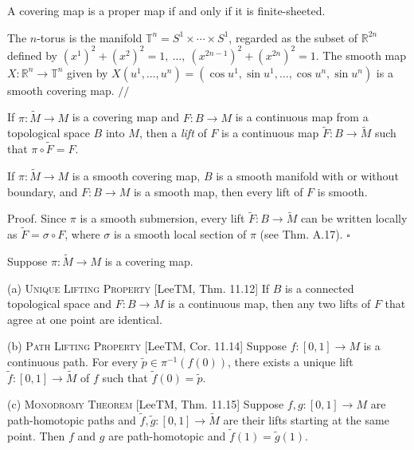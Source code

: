 \begin{proposition}
\label{prop:covering-proper-finite-sheeted}
A covering map is a proper map if and only if it is finite-sheeted.
\end{proposition}

\begin{example}
\label{ex:covering-n-torus}
The $n$-torus is the manifold $\mathbb{T}^n = S^1 \times \cdots \times S^1$, regarded as the subset of $\mathbb{R}^{2n}$ defined by $(x^1)^2 + (x^2)^2 = 1,\ \ldots,\ (x^{2n-1})^2 + (x^{2n})^2 = 1$. The smooth map $X: \mathbb{R}^n \to \mathbb{T}^n$ given by $X(u^1, \ldots, u^n) = (\cos u^1, \sin u^1, \ldots, \cos u^n, \sin u^n)$ is a smooth covering map. $\mathbin{//}$
\end{example}

If $\pi: \tilde{M} \to M$ is a covering map and $F: B \to M$ is a continuous map from a topological space $B$ into $M$, then a \emph{lift} of $F$ is a continuous map $\tilde{F}: B \to \tilde{M}$ such that $\pi \circ \tilde{F} = F$.

\begin{proposition}
\label{prop:lifts-smooth-maps-smooth}

If $\pi: \tilde{M} \to M$ is a smooth covering map, $B$ is a smooth manifold with or without boundary, and $F: B \to M$ is a smooth map, then every lift of $F$ is smooth.

Proof. Since $\pi$ is a smooth submersion, every lift $\tilde{F}: B \to \tilde{M}$ can be written locally as $\tilde{F} = \sigma \circ F$, where $\sigma$ is a smooth local section of $\pi$ (see Thm. A.17). $\square$
\end{proposition}

\begin{proposition}
\label{prop:lifting-properties-covering}




Suppose $\pi: \tilde{M} \to M$ is a covering map.

(a) \textsc{Unique Lifting Property} [LeeTM, Thm. 11.12] If $B$ is a connected topological space and $F: B \to M$ is a continuous map, then any two lifts of $F$ that agree at one point are identical.

(b) \textsc{Path Lifting Property} [LeeTM, Cor. 11.14] Suppose $f: [0,1] \to M$ is a continuous path. For every $\tilde{p} \in \pi^{-1}(f(0))$, there exists a unique lift $\tilde{f}: [0,1] \to \tilde{M}$ of $f$ such that $\tilde{f}(0) = \tilde{p}$.

(c) \textsc{Monodromy Theorem} [LeeTM, Thm. 11.15] Suppose $f, g: [0,1] \to M$ are path-homotopic paths and $\tilde{f}, \tilde{g}: [0,1] \to \tilde{M}$ are their lifts starting at the same point. Then $f$ and $g$ are path-homotopic and $\tilde{f}(1) = \tilde{g}(1)$.
\end{proposition}

